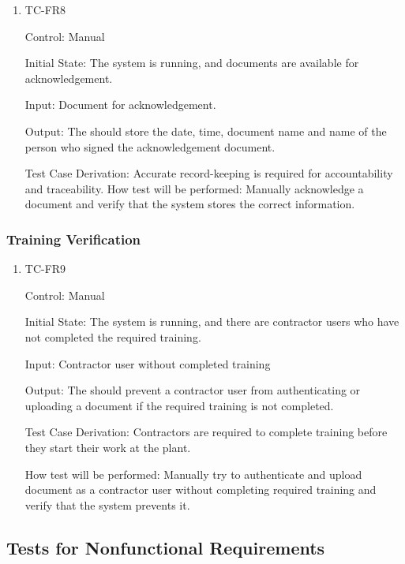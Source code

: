 \documentclass[12pt, titlepage]{article}
\begin{document}
\begin{enumerate}
  \item {TC-FR8\\}

    Control: Manual

    Initial State: The system is running, and documents are available for
    acknowledgement.

    Input: Document for acknowledgement.

    Output: The should store the date, time, document name and name of the
    person who signed the acknowledgement document.

    Test Case Derivation: Accurate record-keeping is required for
    accountability and traceability.
    How test will be performed: Manually acknowledge a document and verify that
    the system stores the correct information.

\end{enumerate}

\subsubsection{Training Verification}

\begin{enumerate}
  \item {TC-FR9\\}

    Control: Manual

    Initial State: The system is running, and there are contractor users who
    have not completed the required training.

    Input: Contractor user without completed training

    Output: The should prevent a contractor user from authenticating or
    uploading a document if the required training is not completed.

    Test Case Derivation: Contractors are required to complete training before
    they start their work at the plant.

    How test will be performed: Manually try to authenticate and upload document
    as a contractor user without completing required training and verify that
    the system prevents it.

\end{enumerate}

\subsection{Tests for Nonfunctional Requirements}
\end{document}
